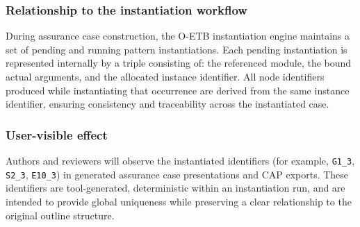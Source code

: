 \documentclass[12pt,twoside,a4paper]{article}
\begin{document}
\subsubsection{Relationship to the instantiation workflow}
During assurance case construction, the O-ETB instantiation engine maintains a
set of pending and running pattern instantiations.
Each pending instantiation is represented internally by a triple consisting of:
the referenced module, the bound actual arguments, and the allocated instance
identifier.
All node identifiers produced while instantiating that occurrence are derived
from the same instance identifier, ensuring consistency and traceability across
the instantiated case.

\subsubsection{User-visible effect}
Authors and reviewers will observe the instantiated identifiers (for example,
\texttt{G1\_3}, \texttt{S2\_3}, \texttt{E10\_3}) in generated assurance case
presentations and CAP exports.
These identifiers are tool-generated, deterministic within an instantiation run,
and are intended to provide global uniqueness while preserving a clear relationship
to the original outline structure.
\end{document}
